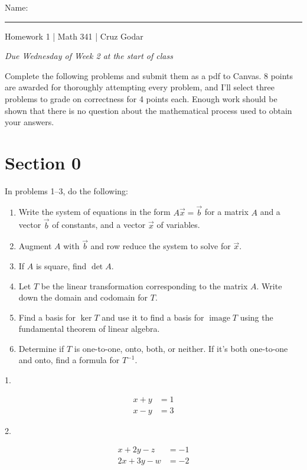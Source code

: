 \documentclass{article}
\begin{document}
\Large Name: \rule{2in}{0.15mm} \hfill Homework 1 | Math 341 | Cruz Godar \vspace{4pt} \normalsize

\textit{Due Wednesday of Week 2 at the start of class}

Complete the following problems and submit them as a pdf to Canvas. 8 points are awarded for thoroughly attempting every problem, and I'll select three problems to grade on correctness for 4 points each. Enough work should be shown that there is no question about the mathematical process used to obtain your answers.

\section{Section 0}

In problems 1--3, do the following:

\begin{enumerate}

	\item Write the system of equations in the form $A\vec{x} = \vec{b}$ for a matrix $A$ and a vector $\vec{b}$ of constants, and a vector $\vec{x}$ of variables.

	\item Augment $A$ with $\vec{b}$ and row reduce the system to solve for $\vec{x}$.

	\item If $A$ is square, find $\det A$.

	\item Let $T$ be the linear transformation corresponding to the matrix $A$. Write down the domain and codomain for $T$.

	\item Find a basis for $\ker T$ and use it to find a basis for $\operatorname{image} T$ using the fundamental theorem of linear algebra.

	\item Determine if $T$ is one-to-one, onto, both, or neither. If it's both one-to-one and onto, find a formula for $T^{-1}$.

\end{enumerate}

1.

\begin{align*}
	x + y &= 1\\
	x - y &= 3
\end{align*}

2.

\begin{align*}
	x + 2y - z &= -1\\
	2x + 3y - w &= -2
\end{align*}
\end{document}
